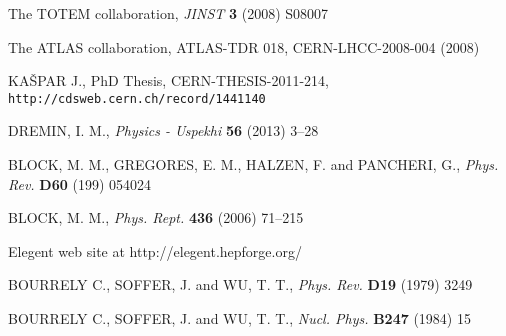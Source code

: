 \documentclass[preprint,12pt]{elsarticle}
\begin{document}




\begin{thebibliography}{00}

\def\Name#1{#1, }
\def\REVIEW#1#2#3#4{{\it #1} {\bf #2} (#3) #4}
	
	\Name{The TOTEM collaboration}
	\REVIEW{JINST}{3}{2008}{S08007}

	\Name{The ATLAS collaboration}
	ATLAS-TDR 018, CERN-LHCC-2008-004 (2008)

    \Name{KA\v SPAR J.}
    PhD Thesis, CERN-THESIS-2011-214, {\tt http://cdsweb.cern.ch/record/1441140}

	\Name{DREMIN, I. M.}
	\REVIEW{Physics - Uspekhi}{56}{2013}{3--28}

	\Name{BLOCK, M. M., GREGORES, E. M., HALZEN, F. and PANCHERI, G.}
	\REVIEW{Phys. Rev.}{D60}{199}{054024}

	\Name{BLOCK, M. M.}
	\REVIEW{Phys. Rept.}{436}{2006}{71--215}


	Elegent web site at http://elegent.hepforge.org/

	\Name{BOURRELY C., SOFFER, J. and WU, T. T.}
	\REVIEW{Phys. Rev.}{D19}{1979}{3249}

	\Name{BOURRELY C., SOFFER, J. and WU, T. T.}
	\REVIEW{Nucl. Phys.}{B247}{1984}{15}


\end{thebibliography}
\end{document}

